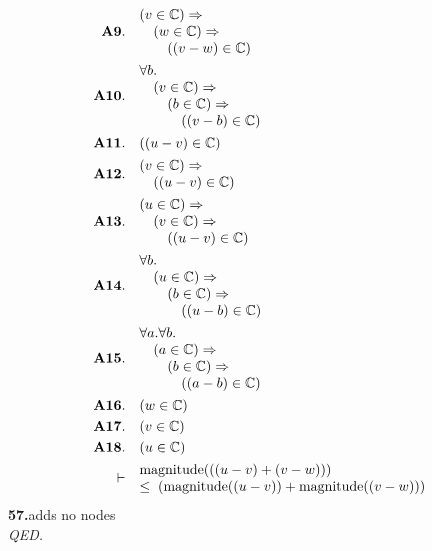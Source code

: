 \documentclass[11pt]{article}
\theoremstyle{plain}
\newcommand{\fit}[1]{\resizebox{\ifdim\width>\linewidth\linewidth\else\width\fi}{!}{#1}}
\begin{document}
\begin{align*}
  \mathbf{A9.}\quad & \begin{array}{@{}l@{}} (v \in \mathbb{C}) \Rightarrow  \\ \quad (w \in \mathbb{C}) \Rightarrow  \\ \quad \quad ((v - w) \in \mathbb{C}) \end{array} \\
  \mathbf{A10.}\quad & \begin{array}{@{}l@{}} \forall b. \\ \quad (v \in \mathbb{C}) \Rightarrow  \\ \quad \quad (b \in \mathbb{C}) \Rightarrow  \\ \quad \quad \quad ((v - b) \in \mathbb{C}) \end{array} \\
  \mathbf{A11.}\quad & ((u - v) \in \mathbb{C}) \\
  \mathbf{A12.}\quad & \begin{array}{@{}l@{}} (v \in \mathbb{C}) \Rightarrow  \\ \quad ((u - v) \in \mathbb{C}) \end{array} \\
  \mathbf{A13.}\quad & \begin{array}{@{}l@{}} (u \in \mathbb{C}) \Rightarrow  \\ \quad (v \in \mathbb{C}) \Rightarrow  \\ \quad \quad ((u - v) \in \mathbb{C}) \end{array} \\
  \mathbf{A14.}\quad & \begin{array}{@{}l@{}} \forall b. \\ \quad (u \in \mathbb{C}) \Rightarrow  \\ \quad \quad (b \in \mathbb{C}) \Rightarrow  \\ \quad \quad \quad ((u - b) \in \mathbb{C}) \end{array} \\
  \mathbf{A15.}\quad & \begin{array}{@{}l@{}} \forall a. \forall b. \\ \quad (a \in \mathbb{C}) \Rightarrow  \\ \quad \quad (b \in \mathbb{C}) \Rightarrow  \\ \quad \quad \quad ((a - b) \in \mathbb{C}) \end{array} \\
  \mathbf{A16.}\quad & (w \in \mathbb{C}) \\
  \mathbf{A17.}\quad & (v \in \mathbb{C}) \\
  \mathbf{A18.}\quad & (u \in \mathbb{C}) \\
  \vdash\quad & \begin{array}{@{}l@{}} \operatorname{magnitude}(((u - v) + (v - w))) \\ \leq\; (\operatorname{magnitude}((u - v)) + \operatorname{magnitude}((v - w))) \end{array}
\end{align*}
\medskip\noindent\textbf{57.}\quad \fit{\texttt{(ass)}}\hfill{\small adds no nodes}\\[2pt]
\emph{QED.}\par
\end{document}
